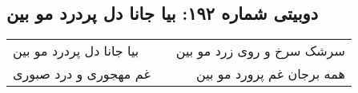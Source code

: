 \begin{center}
\section*{دوبیتی شماره ۱۹۲: بیا جانا دل پردرد مو بین}
\label{sec:192}
\begin{longtable}{l p{0.5cm} r}
بیا جانا دل پردرد مو بین
&&
سرشک سرخ و روی زرد مو بین
\\
غم مهجوری و درد صبوری
&&
همه برجان غم پرورد مو بین
\\
\end{longtable}
\end{center}

